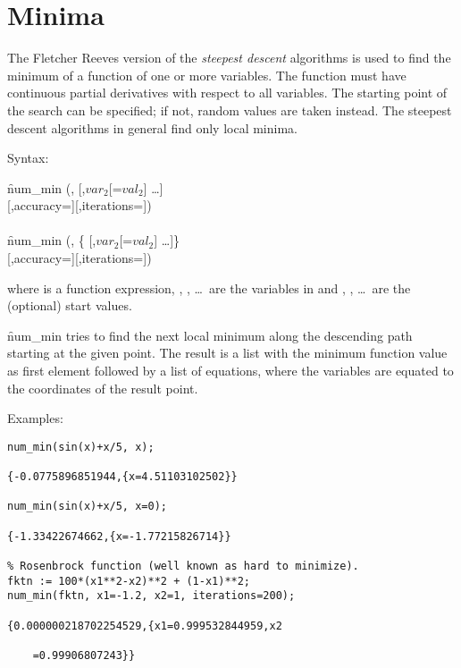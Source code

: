 \section{Minima}
\hypertarget{operator:NUM_MIN}{}

The Fletcher Reeves version of the \emph{steepest descent}
algorithms is used to find the minimum of a
function of one or more variables. The
function must have continuous partial derivatives with respect to all
variables. The starting point of the search can be
specified; if not, random values are taken instead.
The steepest descent algorithms in general find only local
minima.

Syntax:
\begin{syntaxtable}
  \f{num\_min} (,  [,$var_2$[=$val_2$] \ldots]\\
             [,accuracy=][,iterations=]) \\
\\
  \f{num\_min} (, \{ [,$var_2$[=$val_2$] \ldots]\}\\
             [,accuracy=][,iterations=])
\end{syntaxtable}
where  is a function expression, , , \ldots\ are
the variables in  and , , \ldots\  are
the (optional) start values.

\f{num\_min} tries to find the next local minimum along the descending
path starting at the given point. The result is a list
with the minimum function value as first element followed by a list
of equations, where the variables are equated to the coordinates
of the result point.

Examples:
\begin{verbatim}
num_min(sin(x)+x/5, x);

{-0.0775896851944,{x=4.51103102502}}

num_min(sin(x)+x/5, x=0);

{-1.33422674662,{x=-1.77215826714}}

% Rosenbrock function (well known as hard to minimize).
fktn := 100*(x1**2-x2)**2 + (1-x1)**2;
num_min(fktn, x1=-1.2, x2=1, iterations=200);

{0.000000218702254529,{x1=0.999532844959,x2

    =0.99906807243}}
\end{verbatim}

